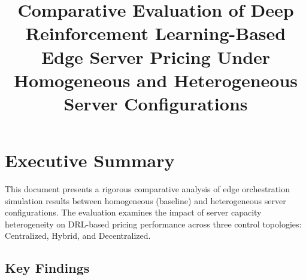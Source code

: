 \documentclass[conference]{IEEEtran}
\begin{document}
\title{Comparative Evaluation of Deep Reinforcement Learning-Based Edge Server Pricing Under Homogeneous and Heterogeneous Server Configurations}

\maketitle

\section{Executive Summary}

This document presents a rigorous comparative analysis of edge orchestration simulation results between homogeneous (baseline) and heterogeneous server configurations. The evaluation examines the impact of server capacity heterogeneity on DRL-based pricing performance across three control topologies: Centralized, Hybrid, and Decentralized.

\subsection{Key Findings}
\end{document}
